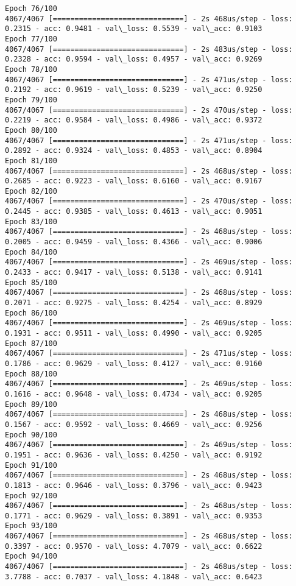 \documentclass[11pt]{article}
\begin{document}
\begin{Verbatim}[commandchars=\\\{\}]
Epoch 76/100
4067/4067 [==============================] - 2s 468us/step - loss: 0.2315 - acc: 0.9481 - val\_loss: 0.5539 - val\_acc: 0.9103
Epoch 77/100
4067/4067 [==============================] - 2s 483us/step - loss: 0.2328 - acc: 0.9594 - val\_loss: 0.4957 - val\_acc: 0.9269
Epoch 78/100
4067/4067 [==============================] - 2s 471us/step - loss: 0.2192 - acc: 0.9619 - val\_loss: 0.5239 - val\_acc: 0.9250
Epoch 79/100
4067/4067 [==============================] - 2s 470us/step - loss: 0.2219 - acc: 0.9584 - val\_loss: 0.4986 - val\_acc: 0.9372
Epoch 80/100
4067/4067 [==============================] - 2s 471us/step - loss: 0.2892 - acc: 0.9324 - val\_loss: 0.4853 - val\_acc: 0.8904
Epoch 81/100
4067/4067 [==============================] - 2s 468us/step - loss: 0.2685 - acc: 0.9223 - val\_loss: 0.6160 - val\_acc: 0.9167
Epoch 82/100
4067/4067 [==============================] - 2s 470us/step - loss: 0.2445 - acc: 0.9385 - val\_loss: 0.4613 - val\_acc: 0.9051
Epoch 83/100
4067/4067 [==============================] - 2s 468us/step - loss: 0.2005 - acc: 0.9459 - val\_loss: 0.4366 - val\_acc: 0.9006
Epoch 84/100
4067/4067 [==============================] - 2s 469us/step - loss: 0.2433 - acc: 0.9417 - val\_loss: 0.5138 - val\_acc: 0.9141
Epoch 85/100
4067/4067 [==============================] - 2s 468us/step - loss: 0.2071 - acc: 0.9275 - val\_loss: 0.4254 - val\_acc: 0.8929
Epoch 86/100
4067/4067 [==============================] - 2s 469us/step - loss: 0.1931 - acc: 0.9511 - val\_loss: 0.4990 - val\_acc: 0.9205
Epoch 87/100
4067/4067 [==============================] - 2s 471us/step - loss: 0.1786 - acc: 0.9629 - val\_loss: 0.4127 - val\_acc: 0.9160
Epoch 88/100
4067/4067 [==============================] - 2s 469us/step - loss: 0.1616 - acc: 0.9648 - val\_loss: 0.4734 - val\_acc: 0.9205
Epoch 89/100
4067/4067 [==============================] - 2s 468us/step - loss: 0.1567 - acc: 0.9592 - val\_loss: 0.4669 - val\_acc: 0.9256
Epoch 90/100
4067/4067 [==============================] - 2s 469us/step - loss: 0.1951 - acc: 0.9636 - val\_loss: 0.4250 - val\_acc: 0.9192
Epoch 91/100
4067/4067 [==============================] - 2s 468us/step - loss: 0.1813 - acc: 0.9646 - val\_loss: 0.3796 - val\_acc: 0.9423
Epoch 92/100
4067/4067 [==============================] - 2s 468us/step - loss: 0.1771 - acc: 0.9629 - val\_loss: 0.3891 - val\_acc: 0.9353
Epoch 93/100
4067/4067 [==============================] - 2s 468us/step - loss: 0.3397 - acc: 0.9570 - val\_loss: 4.7079 - val\_acc: 0.6622
Epoch 94/100
4067/4067 [==============================] - 2s 468us/step - loss: 3.7788 - acc: 0.7037 - val\_loss: 4.1848 - val\_acc: 0.6423

\end{Verbatim}
\end{document}

